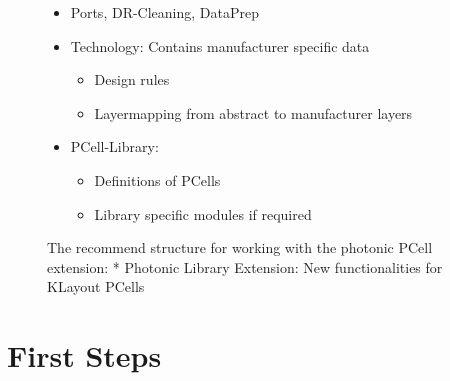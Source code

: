 \documentclass[a4paper,10pt,english]{sphinxmanual}
\begin{document}
\begin{figure}[htbp]
\centering
\capstart

\noindent{}
\caption{The recommend structure for working with the photonic PCell extension:
* Photonic Library Extension: New functionalities for KLayout PCells}
\begin{sphinxlegend}\begin{itemize}
\item {} 
Ports, DR-Cleaning, DataPrep

\end{itemize}
\begin{itemize}
\item {} 
Technology: Contains manufacturer specific data
\begin{itemize}
\item {} 
Design rules

\item {} 
Layermapping from abstract to manufacturer layers

\end{itemize}

\item {} 
PCell-Library:
\begin{itemize}
\item {} 
Definitions of PCells

\item {} 
Library specific modules if required

\end{itemize}

\end{itemize}
\end{sphinxlegend}
\label{\detokenize{introduction:p-format}}\end{figure}


\chapter{First Steps}
\label{\detokenize{first_steps:first-steps}}\label{\detokenize{first_steps::doc}}
\end{document}
